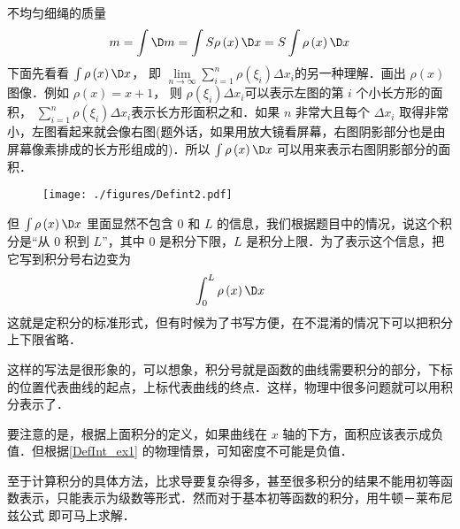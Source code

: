 \begin{exam}{不均匀细绳的质量}
\begin{equation}
m = \int {\D m}  = \int {S\rho \left( x \right)\D x}  = S\int {\rho \left( x \right)\D x} 
\end{equation}
下面先看看 $\int {\rho \left( x \right)\D x} $， 即 $\mathop {\lim }\limits_{n \to \infty } \sum\limits_{i = 1}^n {\rho \left( {{\xi _i}} \right)\Delta {x_i} } $的另一种理解．画出 $\rho (x)$图像．例如 $\rho \left( x \right) = x + 1$， 则 $\rho \left( {{\xi _i}} \right)\Delta {x_i}$可以表示左图的第 $i$ 个小长方形的面积， $\sum\limits_{i = 1}^n {\rho \left( {{\xi _i}} \right)\Delta {x_i} } $表示长方形面积之和．如果 $n$ 非常大且每个 $\Delta {x_i}$ 取得非常小，左图看起来就会像右图(题外话，如果用放大镜看屏幕，右图阴影部分也是由屏幕像素排成的长方形组成的)．所以 $\int {\rho \left( x \right)\D x} $ 可以用来表示右图阴影部分的面积．

\begin{figure}[h]
\centering
\texttt{[image: ./figures/Defint2.pdf]}
\end{figure}

但 $\int {\rho \left( x \right)\D x} $ 里面显然不包含 $0$ 和 $L$ 的信息，我们根据题目中的情况，说这个积分是“从 $0$ 积到 $L$”，其中 $0$ 是积分下限，$L$ 是积分上限．为了表示这个信息，把它写到积分号右边变为
\begin{equation}
\int_0^L {\rho \left( x \right)\D x} 
\end{equation}
这就是定积分的标准形式，但有时候为了书写方便，在不混淆的情况下可以把积分上下限省略．
\end{exam}

这样的写法是很形象的，可以想象，积分号就是函数的曲线需要积分的部分，下标的位置代表曲线的起点，上标代表曲线的终点．这样，物理中很多问题就可以用积分表示了．

要注意的是，根据上面积分的定义，如果曲线在 $x$ 轴的下方，面积应该表示成负值．但根据\autoref{DefInt_ex1} 的物理情景，可知密度不可能是负值．

至于计算积分的具体方法，比求导要复杂得多，甚至很多积分的结果不能用初等函数表示，只能表示为级数等形式．然而对于基本初等函数的积分，用牛顿－莱布尼兹公式 即可马上求解．


